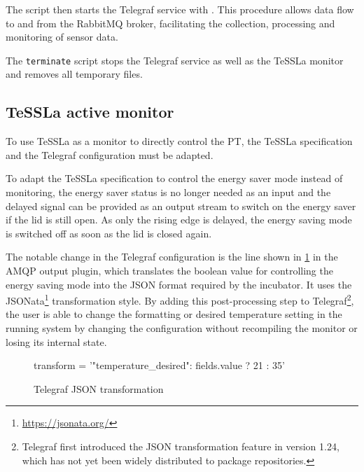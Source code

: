 %
The script then starts the Telegraf service with . This procedure allows data flow to and from the RabbitMQ broker, facilitating the collection, processing and monitoring of sensor data.

The \texttt{terminate} script stops the Telegraf service as well as the TeSSLa monitor and removes all temporary files.

\subsection{TeSSLa active monitor}\label{subsec:TESLA2}
To use TeSSLa as a monitor to directly control the PT, the TeSSLa specification and the Telegraf configuration must be adapted.

To adapt the TeSSLa specification to control the energy saver mode instead of monitoring, the energy saver status is no longer needed as an input and the delayed signal can be provided as an output stream to switch on the energy saver if the lid is still open. As only the rising edge is delayed, the energy saving mode is switched off as soon as the lid is closed again.

The notable change in the Telegraf configuration is the line shown in \cref{fig:telegraf_json_transformation} in the AMQP output plugin, which translates the boolean value for controlling the energy saving mode into the JSON format required by the incubator. It uses the JSONata\footnote{\url{https://jsonata.org/}} transformation style.
By adding this post-processing step to Telegraf\footnote{
	Telegraf first introduced the JSON transformation feature in version 1.24, which has not yet been widely distributed to package repositories.
}, the user is able to change the formatting or desired temperature setting in the running system by changing the configuration without recompiling the monitor or losing its internal state.%
%
\begin{figure}[ht]
	\begin{textcode}
		transform = '{"temperature_desired": fields.value ? 21 : 35}'
	\end{textcode}
	\caption{Telegraf JSON transformation}
	\label{fig:telegraf_json_transformation}
\end{figure}%














